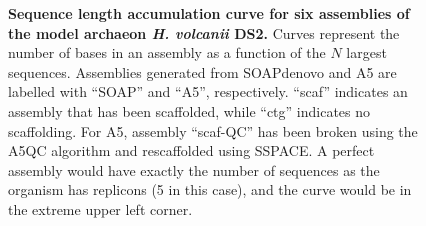 \documentclass[10pt]{article}
\begin{document}
\begin{figure}[hp]
\caption{\textbf{Sequence length accumulation curve for six assemblies of the model archaeon \textit{H. volcanii} DS2.} Curves represent the number of bases 
in an assembly as a function of the $N$ largest sequences. Assemblies generated from SOAPdenovo and A5 are labelled with ``SOAP'' and ``A5'', 
respectively. ``scaf'' indicates an assembly that has been scaffolded, while ``ctg'' indicates 
no scaffolding. For A5, assembly ``scaf-QC'' has been broken using the A5QC algorithm and rescaffolded using SSPACE.
A perfect assembly would have exactly the number of sequences as the organism has replicons (5 in this case), and the curve would be
in the extreme upper left corner.}
\label{fig:03}
\end{figure}

\clearpage
\end{document}
